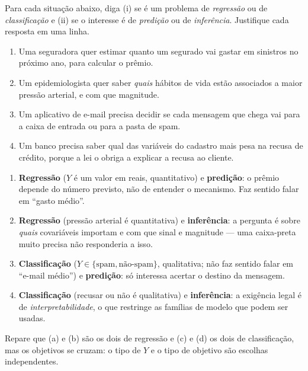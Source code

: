 \documentclass[11pt,a4paper]{article}
\begin{document}

\begin{exercicio}
Para cada situação abaixo, diga (i) se é um problema de \emph{regressão} ou de
\emph{classificação} e (ii) se o interesse é de \emph{predição} ou de
\emph{inferência}. Justifique cada resposta em uma linha.
\begin{enumerate}[label=(\alph*),leftmargin=1.1cm]
  \item Uma seguradora quer estimar quanto um segurado vai gastar em sinistros no
        próximo ano, para calcular o prêmio.
  \item Um epidemiologista quer saber \emph{quais} hábitos de vida estão associados
        a maior pressão arterial, e com que magnitude.
  \item Um aplicativo de e-mail precisa decidir se cada mensagem que chega vai para
        a caixa de entrada ou para a pasta de spam.
  \item Um banco precisa saber qual das variáveis do cadastro mais pesa na recusa
        de crédito, porque a lei o obriga a explicar a recusa ao cliente.
\end{enumerate}
\end{exercicio}

\begin{solucao}
\begin{enumerate}[label=(\alph*),leftmargin=1.1cm]
  \item \textbf{Regressão} ($Y$ é um valor em reais, quantitativo) e
        \textbf{predição}: o prêmio depende do número previsto, não de entender o
        mecanismo. Faz sentido falar em ``gasto médio''.
  \item \textbf{Regressão} (pressão arterial é quantitativa) e
        \textbf{inferência}: a pergunta é sobre \emph{quais} covariáveis importam
        e com que sinal e magnitude --- uma caixa-preta muito precisa não
        responderia a isso.
  \item \textbf{Classificação} ($Y\in\{\text{spam},\text{não-spam}\}$, qualitativa;
        não faz sentido falar em ``e-mail médio'') e \textbf{predição}: só
        interessa acertar o destino da mensagem.
  \item \textbf{Classificação} (recusar ou não é qualitativa) e
        \textbf{inferência}: a exigência legal é de \emph{interpretabilidade}, o
        que restringe as famílias de modelo que podem ser usadas.
\end{enumerate}
Repare que (a) e (b) são os dois de regressão e (c) e (d) os dois de
classificação, mas os objetivos se cruzam: o tipo de $Y$ e o tipo de objetivo são
escolhas independentes.
\end{solucao}
\end{document}
